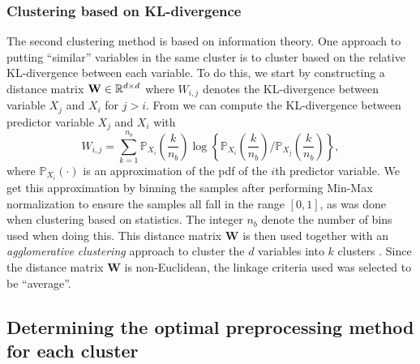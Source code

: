\documentclass{statsmsc}
\begin{document}
{\subsubsection{Clustering based on KL-divergence}%
\label{sub:Clustering based on KL-divergence}

The second clustering method is based on information theory.
One approach to putting ``similar'' variables in the same cluster is to cluster based on the
relative \ac{KL-divergence} between each variable.
To do this, we start by constructing a
distance matrix $\mathbf{W} \in \mathbb{R}^{d \times d}$ where $W_{i,j}$ denotes the
\ac{KL-divergence} between variable $X_j$ and $X_i$ for $j > i$. From
\citep{mackay} we can compute the \ac{KL-divergence} between predictor variable $X_j$ and $X_i$
with
\begin{equation}
    W_{i,j}= \sum^{n_{b }}_{k=1} \mathbb{P}_{X_i}\left( \frac{k}{n_{b }}  \right)
    \log\left\{
    \mathbb{P}_{X_i}\left( \frac{k}{n_{b }}  \right) \bigg/
    \mathbb{P}_{X_j}\left( \frac{k}{n_{b }}  \right)
\right\},
\end{equation}
where $\mathbb{P}_{X_i}(\cdot)$ is an approximation of the \ac{pdf} of the $i$th predictor variable.
We get this approximation by binning the samples after performing Min-Max normalization to ensure
the samples all fall in the range $[0,1]$, as was done when clustering based on statistics.
The integer $n_{b}$ denote the number of bins used when doing this.
This distance matrix $\mathbf{W}$ is then used together with an \textit{agglomerative clustering}
approach to cluster the $d$ variables into $k$ clusters
\citep{hierarchical_clustering}. Since the distance matrix $\mathbf{W}$ is
non-Euclidean, the linkage criteria used was selected to be ``average''.


\subsection{Determining the optimal preprocessing method for each cluster}%
\label{sub:prep_determine}

}
\end{document}
